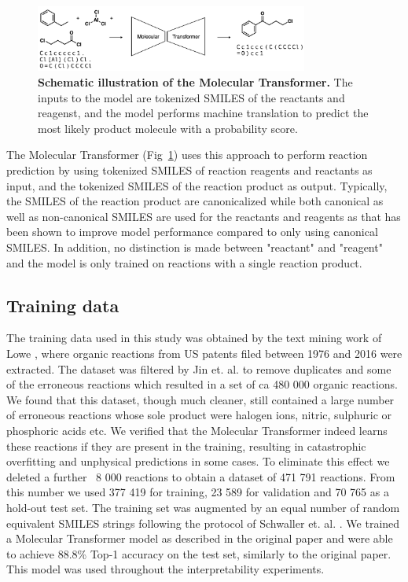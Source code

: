 \begin{figure}[ht!]
    \centering
    \includegraphics[width=0.8\textwidth]{Chapters/Transformer/Figs/mol_transformer.png}
    \caption{\label{fig:mol_transformer} \textbf{Schematic illustration of the Molecular Transformer.} The inputs to the model are tokenized SMILES of the reactants and reagenst, and the model performs machine translation to predict the most likely product molecule with a probability score.}
\end{figure}

The Molecular Transformer (Fig~\ref{fig:mol_transformer}) uses this approach to perform reaction prediction by using tokenized SMILES of reaction reagents and reactants as input, and the tokenized SMILES of the reaction product as output. Typically, the SMILES of the reaction product are canonicalized while both canonical as well as non-canonical SMILES are used for the reactants and reagents as that has been shown to improve model performance \cite{Bjerrum2017SMILESaugmentation} compared to only using canonical SMILES. In addition, no distinction is made between "reactant" and "reagent" and the model is only trained on reactions with a single reaction product.

\subsection{Training data}
The training data used in this study was obtained by the text mining work of Lowe \cite{Lowe2012}, where organic reactions from US patents filed between 1976 and 2016 were extracted. The dataset was filtered by Jin et. al. \cite{Jin2017} to remove duplicates and some of the erroneous reactions which resulted in a set of ca 480 000 organic reactions. We found that this dataset, though much cleaner, still contained a large number of erroneous reactions whose sole product were halogen ions, nitric, sulphuric or phosphoric acids etc. We verified that the Molecular Transformer indeed learns these reactions if they are present in the training, resulting in catastrophic overfitting and unphysical predictions in some cases. To eliminate this effect we deleted a further ~8 000 reactions to obtain a dataset of 471 791 reactions. From this number we used 377 419 for training, 23 589 for validation and 70 765 as a hold-out test set. The training set was augmented by an equal number of random equivalent SMILES strings following the protocol of Schwaller et. al. \cite{Schwaller2019}. We trained a Molecular Transformer model as described in the original paper and were able to achieve 88.8\% Top-1 accuracy on the test set, similarly to the original paper. This model was used throughout the interpretability experiments.

